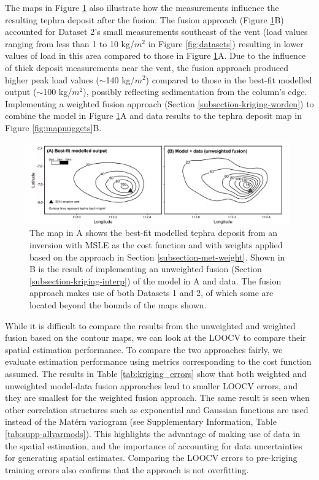 The maps in Figure \ref{fig:mapkriged} also illustrate how the measurements influence the resulting tephra deposit after the fusion. The fusion approach (Figure \ref{fig:mapkriged}B) accounted for Dataset 2's small measurements southeast of the vent (load values ranging from less than 1 to 10 kg/$m^2$ in Figure \ref{fig:datasets}) resulting in lower values of load in this area compared to those in Figure \ref{fig:mapkriged}A. Due to the influence of thick deposit measurements near the vent, the fusion approach produced higher peak load values ($\sim$140 kg/$m^2$) compared to those in the best-fit modelled output ($\sim$100 kg/$m^2$), possibly reflecting sedimentation from the column's edge. Implementing a weighted fusion approach (Section \ref{subsection-kriging-worden}) to combine the model in Figure \ref{fig:mapkriged}A and data results to the tephra deposit map in Figure \ref{fig:mapnuggets}B. 

    \begin{figure}[htbp!]
    \centering
    \includegraphics[width=\linewidth]{Figures/fig7_kriging-maps.png}
    \caption{The map in A shows the best-fit modelled tephra deposit from an inversion with MSLE as the cost function and with weights applied based on the approach in Section \ref{subsection-met-weight}. Shown in B is the result of implementing an unweighted fusion (Section \ref{subsection-kriging-interp}) of the model in A and data. The fusion approach makes use of both Datasets 1 and 2, of which some are located beyond the bounds of the maps shown.}
    \label{fig:mapkriged}
    \end{figure}

While it is difficult to compare the results from the unweighted and weighted fusion based on the contour maps, we can look at the LOOCV to compare their spatial estimation performance. To compare the two approaches fairly, we evaluate estimation performance using metrics corresponding to the cost function assumed. The results in Table \ref{tab:kriging_errors} show that both weighted and unweighted model-data fusion approaches lead to smaller LOOCV errors, and they are smallest for the weighted fusion approach. The same result is seen when other correlation structures such as exponential and Gaussian functions are used instead of the Mat\'ern variogram (see Supplementary Information, Table \ref{tab:supp-allvarmods}). This highlights the advantage of making use of data in the spatial estimation, and the importance of accounting for data uncertainties for generating spatial estimates. Comparing the LOOCV errors to pre-kriging training errors also confirms that the approach is not overfitting.

